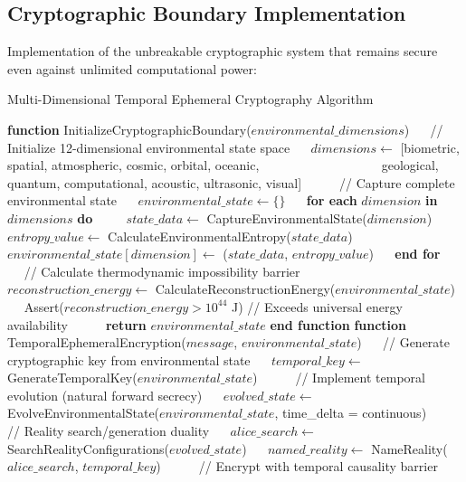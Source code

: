 \documentclass[12pt,a4paper]{article}
\theoremstyle{definition}
\begin{document}
{\subsection{Cryptographic Boundary Implementation}

Implementation of the unbreakable cryptographic system that remains secure even against unlimited computational power:

\begin{algorithm}
\caption{Multi-Dimensional Temporal Ephemeral Cryptography Algorithm}
\begin{algorithmic}[1]
\STATE \textbf{function} InitializeCryptographicBoundary($environmental\_dimensions$)
\STATE $\quad$ // Initialize 12-dimensional environmental state space
\STATE $\quad$ $dimensions \leftarrow$ [biometric, spatial, atmospheric, cosmic, orbital, oceanic,
\STATE $\quad\quad\quad\quad\quad\quad\quad\quad\quad$ geological, quantum, computational, acoustic, ultrasonic, visual]
\STATE $\quad$
\STATE $\quad$ // Capture complete environmental state
\STATE $\quad$ $environmental\_state \leftarrow \{\}$
\STATE $\quad$ \textbf{for each} $dimension$ \textbf{in} $dimensions$ \textbf{do}
\STATE $\quad\quad$ $state\_data \leftarrow$ CaptureEnvironmentalState($dimension$)
\STATE $\quad\quad$ $entropy\_value \leftarrow$ CalculateEnvironmentalEntropy($state\_data$)
\STATE $\quad\quad$ $environmental\_state[dimension] \leftarrow$ ($state\_data$, $entropy\_value$)
\STATE $\quad$ \textbf{end for}
\STATE $\quad$
\STATE $\quad$ // Calculate thermodynamic impossibility barrier
\STATE $\quad$ $reconstruction\_energy \leftarrow$ CalculateReconstructionEnergy($environmental\_state$)
\STATE $\quad$ Assert($reconstruction\_energy > 10^{44}$ J) // Exceeds universal energy availability
\STATE $\quad$
\STATE $\quad$ \textbf{return} $environmental\_state$
\STATE \textbf{end function}
\STATE
\STATE \textbf{function} TemporalEphemeralEncryption($message$, $environmental\_state$)
\STATE $\quad$ // Generate cryptographic key from environmental state
\STATE $\quad$ $temporal\_key \leftarrow$ GenerateTemporalKey($environmental\_state$)
\STATE $\quad$
\STATE $\quad$ // Implement temporal evolution (natural forward secrecy)
\STATE $\quad$ $evolved\_state \leftarrow$ EvolveEnvironmentalState($environmental\_state$, time\_delta = continuous)
\STATE $\quad$
\STATE $\quad$ // Reality search/generation duality
\STATE $\quad$ $alice\_search \leftarrow$ SearchRealityConfigurations($evolved\_state$)
\STATE $\quad$ $named\_reality \leftarrow$ NameReality($alice\_search$, $temporal\_key$)
\STATE $\quad$
\STATE $\quad$ // Encrypt with temporal causality barrier

\end{algorithmic}
\end{algorithm}}
\end{document}
